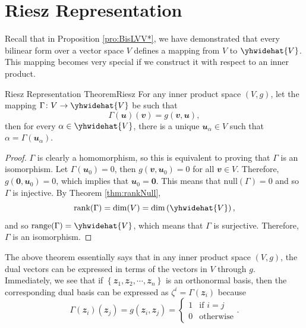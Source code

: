 \documentclass[math, code]{amznotes}
\theoremstyle{remark}
\newcommand{\zero}{\mathbf{0}}
\begin{document}
    \section{Riesz Representation}
    Recall that in Proposition \ref{pro:BisLVV*}, we have demonstrated that every bilinear form over a vector space $V$ defines a mapping from $V$ to $\yhwidehat{V}$. This mapping becomes very special if we construct it with respect to an inner product.
    \begin{thmbox}{Riesz Representation Theorem}{Riesz}
        For any inner product space $(V, g)$, let the mapping $\Gamma \colon V \to \yhwidehat{V}$ be such that
        \begin{equation*}
            \Gamma(\mathbfit{u})(\mathbfit{v}) = g(\mathbfit{v}, \mathbfit{u}),
        \end{equation*}
        then for every $\alpha \in \yhwidehat{V}$, there is a unique $\mathbfit{u}_{\alpha} \in V$ such that $\alpha = \Gamma\left(\mathbfit{u}_{\alpha}\right)$.
        \tcblower
        \begin{proof}
            $\Gamma$ is clearly a homomorphism, so this is equivalent to proving that $\Gamma$ is an isomorphism. Let $\Gamma(\mathbfit{u}_0) = 0$, then $g(\mathbfit{v}, \mathbfit{u}_0) = 0$ for all $\mathbfit{v} \in V$. Therefore, $g(\zero, \mathbfit{u}_0) = 0$, which implies that $\mathbfit{u}_0 = \zero$. This means that $\mathrm{null}(\Gamma) = 0$ and so $\Gamma$ is injective. By Theorem \ref{thm:rankNull}, 
            \begin{equation*}
                \mathrm{rank}(\Gamma) = \dim(V) = \dim\left(\yhwidehat{V}\right),
            \end{equation*}
            and so $\mathrm{range}(\Gamma) = \yhwidehat{V}$, which means that $\Gamma$ is surjective. Therefore, $\Gamma$ is an isomorphism.
        \end{proof}
    \end{thmbox}
    The above theorem essentially says that in any inner product space $(V, g)$, the dual vectors can be expressed in terms of the vectors in $V$ through $g$. Immediately, we see that if $\left\{\mathbfit{z}_1, \mathbfit{z}_2, \cdots, \mathbfit{z}_n\right\}$ is an orthonormal basis, then the corresponding dual basis can be expressed as $\zeta^i = \Gamma\left(\mathbfit{z}_i\right)$ because 
    \begin{equation*}
        \Gamma\left(\mathbfit{z}_i\right)\left(\mathbfit{z}_j\right) = g\left(\mathbfit{z}_i, \mathbfit{z}_j\right) = \begin{cases}
            1 & \textrm{if } i = j \\
            0 & \textrm{otherwise}
        \end{cases}.
    \end{equation*}
\end{document}

